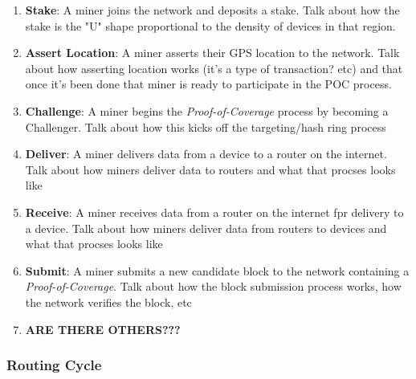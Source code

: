 \documentclass[letterpaper,11pt]{article}
\def\proofofcoverage/{\emph{Proof-of-Coverage}}
\begin{document}
\begin{enumerate}
  \item \textbf{Stake}: A miner joins the network and deposits a stake.\newline
  Talk about how the stake is the "U" shape proportional to the density of devices in that region.\newline
  
  \item \textbf{Assert Location}: A miner asserts their GPS location to the network.\newline
  Talk about how asserting location works (it's a type of transaction? etc) and that once it's been done that miner is ready to participate in the POC process.\newline
  
  \item \textbf{Challenge}: A miner begins the \proofofcoverage/ process by becoming a Challenger.\newline
  Talk about how this kicks off the targeting/hash ring process\newline
  
  \item \textbf{Deliver}: A miner delivers data from a device to a router on the internet.\newline
  Talk about how miners deliver data to routers and what that procses looks like\newline
  
  \item \textbf{Receive}: A miner receives data from a router on the internet fpr delivery to a device.\newline
  Talk about how miners deliver data from routers to devices and what that procses looks like\newline
  
  \item \textbf{Submit}: A miner submits a new candidate block to the network containing a \proofofcoverage/.\newline
  Talk about how the block submission process works, how the network verifies the block, etc\newline
  
  \item \textbf{ARE THERE OTHERS???}
  
\end{enumerate}

\subsubsection{Routing Cycle}
\end{document}
